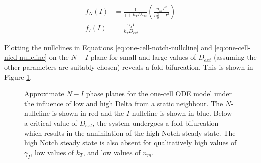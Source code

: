 \documentclass{article}
\begin{document}
\begin{flushleft}
\begin{align}
  \label{eq:one-cell-notch-nullcline}
  f_{N}(I) &= \frac{1}{\gamma + k_{T}D_{ext}}\left(\frac{n_{m}I^2}{n_{0}^2 + I^2}\right) \\[5pt]
  \label{eq:one-cell-nicd-nullcline}
  f_{I}(I) &= \frac{\gamma_{I}I}{k_{T}D_{ext}}
\end{align}

Plotting the nullclines in Equations \ref{eq:one-cell-notch-nullcline} and \ref{eq:one-cell-nicd-nullcline} on the $N-I$ plane for small and large values of $D_{ext}$ (assuming the other parameters are suitably chosen) reveals a fold bifurcation. This is shown in Figure \ref{fig:one-cell-phase-plane}.

\begin{figure}[!htp]
  \label{fig:one-cell-phase-plane}
  \centering
  \caption{Approximate $N-I$ phase planes for the one-cell ODE model under the influence of low and high Delta from a static neighbour. The $N$-nullcline is shown in red and the $I$-nullcline is shown in blue. Below a critical value of $D_{ext}$, the system undergoes a fold bifurcation which results in the annihilation of the high Notch steady state. The high Notch steady state is also absent for qualitatively high values of $\gamma_{I}$, low values of $k_{T}$, and low values of $n_{m}$.}
\end{figure}


\end{flushleft}
\end{document}
